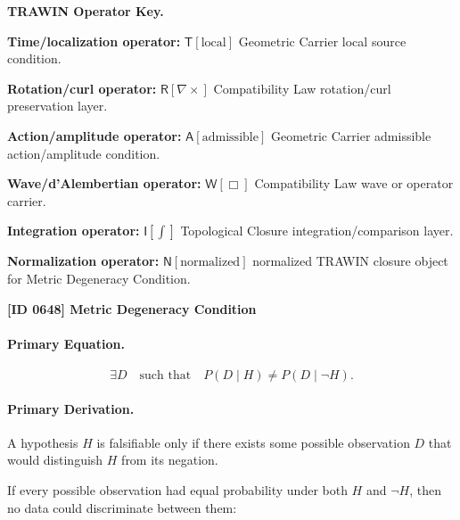 \par\vspace{0.45\baselineskip}
\noindent\begin{minipage}[t]{\linewidth}
\begingroup
\small
\raggedright
\textbf{TRAWIN Operator Key.}\par
\noindent\textbf{Time/localization operator:} $\mathsf{T}\!\left[\mathrm{local}\right]$ Geometric Carrier local source condition.\par
\noindent\textbf{Rotation/curl operator:} $\mathsf{R}\!\left[\nabla\times\right]$ Compatibility Law rotation/curl preservation layer.\par
\noindent\textbf{Action/amplitude operator:} $\mathsf{A}\!\left[\mathrm{admissible}\right]$ Geometric Carrier admissible action/amplitude condition.\par
\noindent\textbf{Wave/d'Alembertian operator:} $\mathsf{W}\!\left[\Box\right]$ Compatibility Law wave or operator carrier.\par
\noindent\textbf{Integration operator:} $\mathsf{I}\!\left[\int\right]$ Topological Closure integration/comparison layer.\par
\noindent\textbf{Normalization operator:} $\mathsf{N}\!\left[\mathrm{normalized}\right]$ normalized TRAWIN closure object for Metric Degeneracy Condition.\par
\endgroup
\end{minipage}

\clearpage
\noindent\textbf{[ID 0648] Metric Degeneracy Condition}\par
\vspace{0.35em}
\paragraph{Primary Equation.}
\begin{equation}
\exists D
\quad\text{such that}\quad
P(D\mid H)\neq P(D\mid \neg H).
\end{equation}

\paragraph{Primary Derivation.}
A hypothesis $H$ is falsifiable only if there exists some possible observation $D$ that would distinguish $H$ from its negation.

If every possible observation had equal probability under both $H$ and $\neg H$, then no data could discriminate between them:

